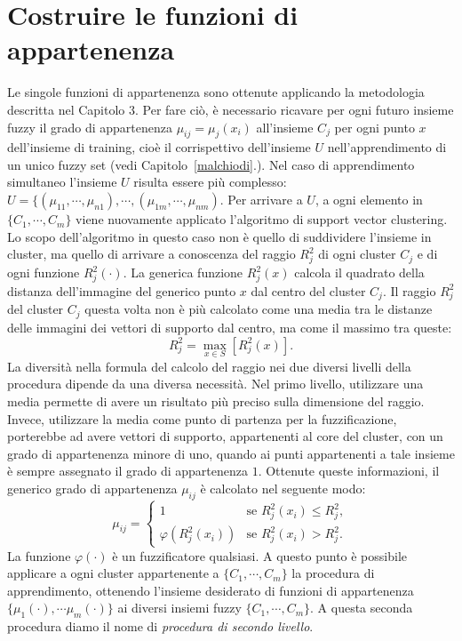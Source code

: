 \documentclass [11pt,a4paper,twoside,openright] {book}
\begin{document}
\section{Costruire le funzioni di appartenenza}
Le singole funzioni di appartenenza sono ottenute applicando la metodologia descritta nel Capitolo 3. Per fare ciò, è necessario ricavare per ogni futuro insieme fuzzy il grado di appartenenza $\mu_{ij}=\mu_j(x_i)$ all'insieme $C_j$ per ogni punto $x$ dell'insieme di training, cioè il corrispettivo dell'insieme $U$ nell'apprendimento di un unico fuzzy set (vedi Capitolo~\ref{malchiodi}.). Nel caso di apprendimento simultaneo l'insieme $U$ risulta essere più complesso: $U = \lbrace ( \mu_{11}, \cdots, \mu_{n1} ), \cdots, (\mu_{1m}, \cdots,  \mu_{nm})$. Per arrivare a $U$, a ogni elemento in $\lbrace C_1, \cdots, C_m \rbrace$ viene nuovamente applicato l'algoritmo di support vector clustering. Lo scopo dell'algoritmo in questo caso non è quello di suddividere l'insieme in cluster, ma quello di arrivare a conoscenza del raggio $R^2_j$ di ogni cluster $C_j$ e di ogni funzione $R_{j}^2(\cdot)$. La generica funzione $R_{j}^2(x)$ calcola il quadrato della distanza dell'immagine del generico punto $x$ dal centro del cluster $C_j$. Il raggio $R^2_j$ del cluster $C_j$ questa volta non è più calcolato come una media tra le distanze delle immagini dei vettori di supporto dal centro, ma come il massimo tra queste:
\begin{equation}
R^2_j = \max_{x \in S} [ R^2_j(x) ].
\end{equation}
La diversità nella formula del calcolo del raggio nei due diversi livelli della procedura dipende da una diversa necessità. Nel primo livello, utilizzare una media permette di avere un risultato più preciso sulla dimensione del raggio. Invece, utilizzare la media come punto di partenza per la fuzzificazione, porterebbe ad avere vettori di supporto, appartenenti al core del cluster, con un grado di appartenenza minore di uno, quando ai punti appartenenti a tale insieme è sempre assegnato il grado di appartenenza $1$.
Ottenute queste informazioni, il generico grado di appartenenza $\mu_{ij}$ è calcolato nel seguente modo:
\begin{equation}
\mu_{ij} =
\begin{cases}
1 & \text{se } R_{j}^2(x_i) \leq R^2_j, \\
\varphi(R_{j}^2(x_i)) & \text{se } R_{j}^2(x_i) > R^2_j.
\end{cases}
\end{equation}
La funzione $\varphi(\cdot)$ è un fuzzificatore qualsiasi. A questo punto è possibile applicare a ogni cluster appartenente a $\lbrace C_1, \cdots, C_m \rbrace$ la procedura di apprendimento, ottenendo l'insieme desiderato di funzioni di appartenenza $\lbrace \mu_1(\cdot), \cdots \mu_m(\cdot) \rbrace$ ai diversi insiemi fuzzy $\lbrace C_1, \cdots, C_m \rbrace$. A questa seconda procedura diamo il nome di \textit{procedura di secondo livello}.
\end{document}
